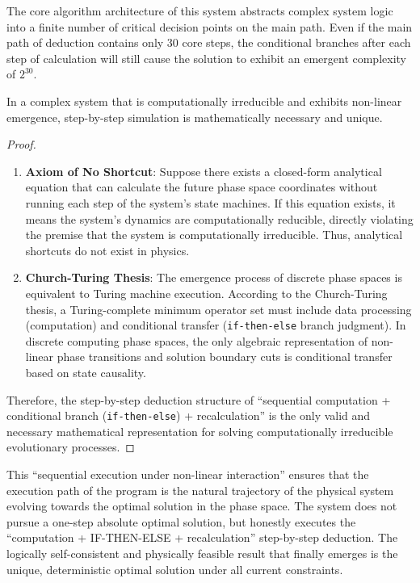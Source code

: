 \documentclass{article}
\begin{document}
The core algorithm architecture of this system abstracts complex system logic into a finite number of critical decision points on the main path. Even if the main path of deduction contains only 30 core steps, the conditional branches after each step of calculation will still cause the solution to exhibit an emergent complexity of $2^{30}$.

\begin{theorem}
In a complex system that is computationally irreducible and exhibits non-linear emergence, step-by-step simulation is mathematically necessary and unique.
\end{theorem}
\begin{proof}
\begin{enumerate}
    \item \textbf{Axiom of No Shortcut}: Suppose there exists a closed-form analytical equation that can calculate the future phase space coordinates without running each step of the system's state machines. If this equation exists, it means the system's dynamics are computationally reducible, directly violating the premise that the system is computationally irreducible. Thus, analytical shortcuts do not exist in physics.
    \item \textbf{Church-Turing Thesis}: The emergence process of discrete phase spaces is equivalent to Turing machine execution. According to the Church-Turing thesis, a Turing-complete minimum operator set must include data processing (computation) and conditional transfer (\texttt{if-then-else} branch judgment). In discrete computing phase spaces, the only algebraic representation of non-linear phase transitions and solution boundary cuts is conditional transfer based on state causality.
\end{enumerate}
Therefore, the step-by-step deduction structure of ``sequential computation + conditional branch (\texttt{if-then-else}) + recalculation'' is the only valid and necessary mathematical representation for solving computationally irreducible evolutionary processes.
\end{proof}

This ``sequential execution under non-linear interaction'' ensures that the execution path of the program is the natural trajectory of the physical system evolving towards the optimal solution in the phase space. The system does not pursue a one-step absolute optimal solution, but honestly executes the ``computation + IF-THEN-ELSE + recalculation'' step-by-step deduction. The logically self-consistent and physically feasible result that finally emerges is the unique, deterministic optimal solution under all current constraints.
\end{document}
